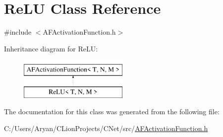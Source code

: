 \hypertarget{class_re_l_u}{}\section{Re\+LU Class Reference}
\label{class_re_l_u}


{\ttfamily \#include $<$A\+F\+Activation\+Function.\+h$>$}

Inheritance diagram for Re\+LU\+:\begin{figure}[H]
\begin{center}
\leavevmode
\includegraphics[height=2.000000cm]{class_re_l_u}
\end{center}
\end{figure}


The documentation for this class was generated from the following file\+:\begin{DoxyCompactItemize}
\item 
C\+:/\+Users/\+Aryan/\+C\+Lion\+Projects/\+C\+Net/src/\hyperlink{_a_f_activation_function_8h}{A\+F\+Activation\+Function.\+h}\end{DoxyCompactItemize}
